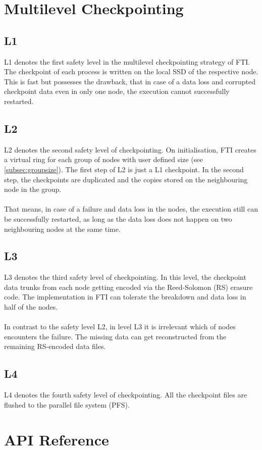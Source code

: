 \documentclass{refrep}
\begin{document}
\chapter{Multilevel Checkpointing}\label{ch:multilevelcheckpointing}
\section{L1}\label{sec:l1}
L1 denotes the first safety level in the multilevel checkpointing strategy of FTI. The checkpoint of each process is written on the local SSD of the respective node. This is fast but possesses the drawback, that in case of a data loss and corrupted checkpoint data even in only one node, the execution cannot successfully restarted.
\section{L2}\label{sec:l2}
L2 denotes the second safety level of checkpointing. On initialisation, FTI creates a virtual ring for each group of nodes with user defined size (see \ref{subsec:groupsize}). The first step of L2 is just a L1 checkpoint. In the second step, the checkpoints are duplicated and the copies stored on the neighbouring node in the group.
\\{}\\
That means, in case of a failure and data loss in the nodes, the execution still can be successfully restarted, as long as the data loss does not happen on two neighbouring nodes at the same time.
\section{L3}\label{sec:l3}
L3 denotes the third safety level of checkpointing. In this level, the checkpoint data trunks from each node getting encoded via the Reed-Solomon (RS) erasure code. The implementation in FTI can tolerate the breakdown and data loss in half of the nodes.
\\{}\\
In contrast to the safety level L2, in level L3 it is irrelevant which of nodes encounters the failure. The missing data can get reconstructed from the remaining RS-encoded data files.
\section{L4}\label{sec:l4}
L4 denotes the fourth safety level of checkpointing. All the checkpoint files are flushed to the parallel file system (PFS).
\chapter{API Reference}\label{ch:apireference}
\end{document}
